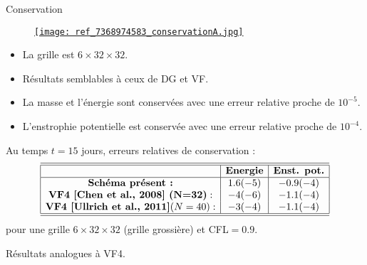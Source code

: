 \documentclass[11pt]{beamer}
\begin{document}

\begin{frame}{Conservation}
\begin{figure}
\href{run:./simus/ref_7367913664.mpeg.avi}{\texttt{[image: ref\_7368974583\_conservationA.jpg]}}
\end{figure}
\begin{itemize}
\item La grille est $6 \times 32 \times 32$.
\item Résultats semblables à ceux de DG et VF.
\item La masse et l'énergie sont conservées avec une erreur relative proche de $10^{-5}$.
\item L'enstrophie potentielle est conservée avec une erreur relative proche de $10^{-4}$.
\end{itemize}
\end{frame}





\begin{frame}{}
Au temps $t = 15$ jours, erreurs relatives de conservation :
\begin{equation*}
\begin{array}{|c|c|c|}
\hline
\hline
 & \textbf{Energie} & \textbf{Enst. pot.} \\
\hline
 \textbf{Schéma présent :} & 1.6 (-5) &-0.9 (-4) \\
 \textbf{VF4 [Chen et al., 2008] (N=32)} : & -4 (-6) & -1.1 (-4) \\
 \textbf{VF4 [Ullrich et al., 2011]} (N=40) : & -3 (-4) & -1.1 (-4) \\
\hline
\hline
\end{array}
\end{equation*}
pour une grille $6 \times 32 \times 32$ (grille grossière) et CFL$=0.9$.
\begin{block}{}
Résultats analogues à VF4.
\end{block}
\end{frame}
\end{document}

